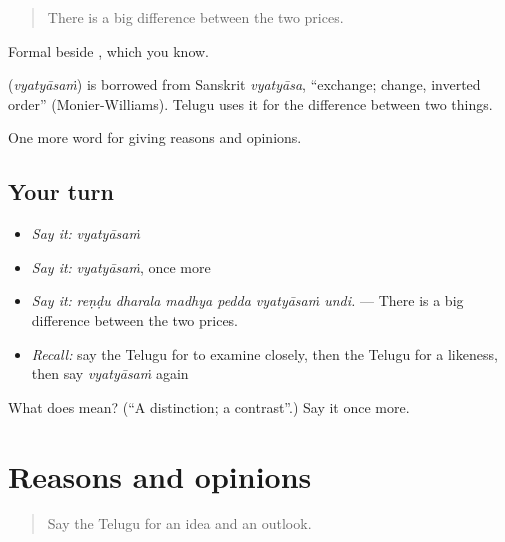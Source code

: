 \begin{quote}
There is a big difference between the two prices.
\end{quote}

Formal beside , which you know.

\begin{cousinweb}
\textbf{} (\emph{vyatyāsaṁ}) is borrowed from Sanskrit \emph{vyatyāsa}, \textquotedblleft{}exchange; change, inverted order\textquotedblright{} (Monier-Williams). Telugu uses it for the difference between two things.
\end{cousinweb}

\begin{grammarlens}[title={What you've built}]
One more word for giving reasons and opinions.
\end{grammarlens}

\subsection*{Your turn}
\begin{itemize}
\raggedright
  \item \emph{Say it:} \emph{vyatyāsaṁ}
  \item \emph{Say it:} \emph{vyatyāsaṁ}, once more
  \item \emph{Say it:} \emph{reṇḍu dharala madhya pedda vyatyāsaṁ undi.} — There is a big difference between the two prices.
  \item \emph{Recall:} say the Telugu for to examine closely, then the Telugu for a likeness, then say \emph{vyatyāsaṁ} again
\end{itemize}

\begin{tcolorbox}[breakable,colback=teal!4,colframe=teal!35!black,title={Before you move on}]
What does  mean? (\textquotedblleft{}A distinction; a contrast\textquotedblright{}.) Say it once more.
\end{tcolorbox}
\section[(dialogue)]{Reasons and opinions}

\label{lesson:TE-R389-review-382-389}



\begin{quote}
Say the Telugu for an idea and an outlook.
\end{quote}

